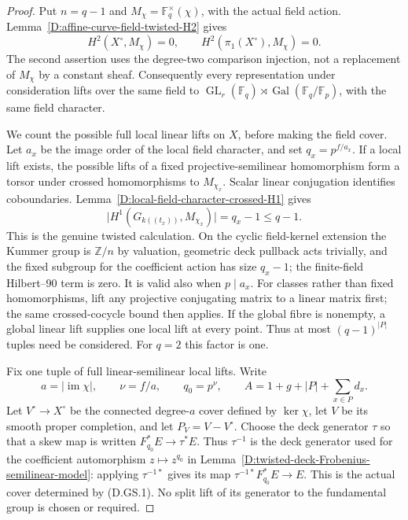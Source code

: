 \begin{proof}
Put \(n=q-1\) and
\(M_\chi=\mathbb F_q^\times(\chi)\), with the actual
field action. Lemma~\ref{D:affine-curve-field-twisted-H2}
gives
\[
 H^2(X^\circ,M_\chi)=0,
 \qquad H^2(\pi_1(X^\circ),M_\chi)=0.
                                                        \tag{D.GS.3}
\]
The second assertion uses the degree-two comparison
injection, not a replacement of \(M_\chi\) by a constant
sheaf. Consequently every representation under
consideration lifts over the same field to
\(\operatorname{GL}_r(\mathbb F_q)\rtimes
\operatorname{Gal}(\mathbb F_q/\mathbb F_p)\), with
the same field character.

We count the possible full local linear lifts on
\(X\), before making the field cover.
Let \(a_x\) be the image order of the local field
character, and set \(q_x=p^{f/a_x}\).
If a local lift exists, the possible lifts of a fixed
projective-semilinear homomorphism form a torsor under
crossed homomorphisms to \(M_{\chi_x}\).
Scalar linear conjugation identifies coboundaries.
Lemma~\ref{D:local-field-character-crossed-H1} gives
\[
 \bigl|H^1(G_{k((t_x))},M_{\chi_x})\bigr|=q_x-1
                                                     \le q-1.
                                                        \tag{D.GS.4}
\]
This is the genuine twisted calculation. On the cyclic
field-kernel extension the Kummer group is \(\mathbb Z/n\)
by valuation, geometric deck pullback acts trivially,
and the fixed subgroup for the coefficient action has
size \(q_x-1\); the finite-field Hilbert--90 term is zero.
It is valid also when \(p\mid a_x\).
For classes rather than fixed homomorphisms, lift any
projective conjugating matrix to a linear matrix first;
the same crossed-cocycle bound then applies.
If the global fibre is nonempty, a global linear lift
supplies one local lift at every point. Thus at most
\((q-1)^{|P|}\) tuples need be considered. For \(q=2\)
this factor is one.

Fix one tuple of full linear-semilinear local lifts.
Write
\[
 a=|\operatorname{im}\chi|,\qquad
 \nu=f/a,\qquad q_0=p^\nu,\qquad
 A=1+g+|P|+\sum_{x\in P}d_x.
                                                        \tag{D.GS.5}
\]
Let \(V^\circ\to X^\circ\) be the connected degree-\(a\)
cover defined by \(\ker\chi\), let \(V\) be its smooth
proper completion, and let \(P_V=V-V^\circ\).
Choose the deck generator \(\tau\) so that a skew
map is written \(F_{q_0}^*E\to\tau^*E\).
Thus \(\tau^{-1}\) is the deck generator used for
the coefficient automorphism \(z\mapsto z^{q_0}\)
in Lemma~\ref{D:twisted-deck-Frobenius-semilinear-model}:
applying \(\tau^{-1*}\) gives its map
\(\tau^{-1*}F_{q_0}^*E\to E\).
This is the actual cover determined by (D.GS.1).
No split lift of its generator to the fundamental
group is chosen or required.


\end{proof}
